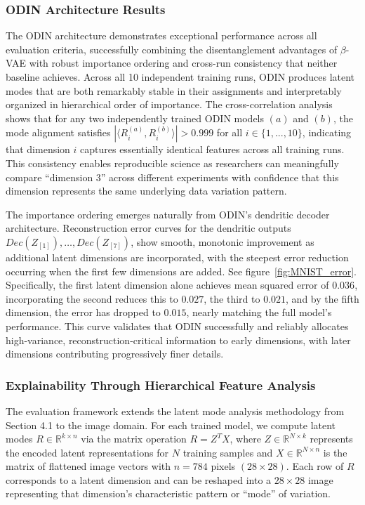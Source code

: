 \documentclass[twoside,11pt]{article}
\begin{document}
\subsubsection*{ODIN Architecture Results} The ODIN architecture demonstrates exceptional performance across all evaluation criteria, successfully combining the disentanglement advantages of $\beta$-VAE with robust importance ordering and cross-run consistency that neither baseline achieves. Across all 10 independent training runs, ODIN produces latent modes that are both remarkably stable in their assignments and interpretably organized in hierarchical order of importance. The cross-correlation analysis shows that for any two independently trained ODIN models $(a)$ and $(b)$, the mode alignment satisfies $|\langle R_i^{(a)}, R_i^{(b)}\rangle|>0.999$ for all $i \in \{1,...,10\}$, indicating that dimension $i$ captures essentially identical features across all training runs. This consistency enables reproducible science as researchers can meaningfully compare ``dimension $3$'' across different experiments with confidence that this dimension represents the same underlying data variation pattern.

The importance ordering emerges naturally from ODIN's dendritic decoder architecture. Reconstruction error curves for the dendritic outputs $Dec(Z_{[1]}), \dots ,Dec(Z_{[7]})$, show smooth, monotonic improvement as additional latent dimensions are incorporated, with the steepest error reduction occurring when the first few dimensions are added. See figure~\ref{fig:MNIST_error}. Specifically, the first latent dimension alone achieves mean squared error of $0.036$, incorporating the second reduces this to $0.027$, the third to $0.021$, and by the fifth dimension, the error has dropped to $0.015$, nearly matching the full model's performance. This curve validates that ODIN successfully and reliably allocates high-variance, reconstruction-critical information to early dimensions, with later dimensions contributing progressively finer details.

\subsubsection*{Explainability Through Hierarchical Feature Analysis}

The evaluation framework extends the latent mode analysis methodology from Section 4.1 to the image domain. For each trained model, we compute latent modes $R\in \mathbb{R}^{k\times n}$ via the matrix operation $ R = Z^T X$, where $Z\in \mathbb{R}^{N\times k}$ represents the encoded latent representations for $N$ training samples and $X\in \mathbb{R}^{N\times n}$ is the matrix of flattened image vectors with $n = 784$ pixels $(28\times 28)$. Each row of $R$ corresponds to a latent dimension and can be reshaped into a $28\times 28$ image representing that dimension's characteristic pattern or ``mode'' of variation.
\end{document}
